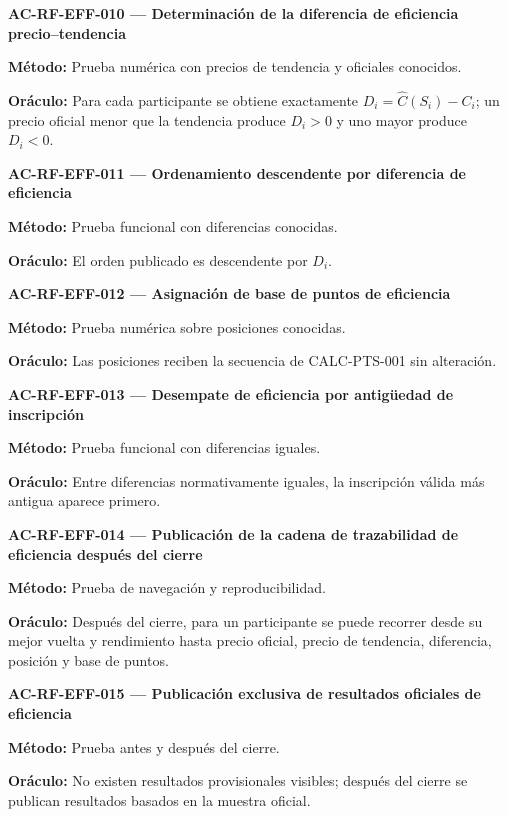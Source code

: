 \documentclass[10pt,letterpaper]{article}
\begin{document}
\noindent\textbf{AC-RF-EFF-010 --- Determinación de la diferencia de eficiencia precio--tendencia}\par
\textbf{Método:} Prueba numérica con precios de tendencia y oficiales conocidos.\par
\textbf{Oráculo:} Para cada participante se obtiene exactamente $D_i=\widehat C(S_i)-C_i$; un precio oficial menor que la tendencia produce $D_i>0$ y uno mayor produce $D_i<0$.\par\vspace{0.45em}
\noindent\textbf{AC-RF-EFF-011 --- Ordenamiento descendente por diferencia de eficiencia}\par
\textbf{Método:} Prueba funcional con diferencias conocidas.\par
\textbf{Oráculo:} El orden publicado es descendente por $D_i$.\par\vspace{0.45em}
\noindent\textbf{AC-RF-EFF-012 --- Asignación de base de puntos de eficiencia}\par
\textbf{Método:} Prueba numérica sobre posiciones conocidas.\par
\textbf{Oráculo:} Las posiciones reciben la secuencia de CALC-PTS-001 sin alteración.\par\vspace{0.45em}
\noindent\textbf{AC-RF-EFF-013 --- Desempate de eficiencia por antigüedad de inscripción}\par
\textbf{Método:} Prueba funcional con diferencias iguales.\par
\textbf{Oráculo:} Entre diferencias normativamente iguales, la inscripción válida más antigua aparece primero.\par\vspace{0.45em}
\noindent\textbf{AC-RF-EFF-014 --- Publicación de la cadena de trazabilidad de eficiencia después del cierre}\par
\textbf{Método:} Prueba de navegación y reproducibilidad.\par
\textbf{Oráculo:} Después del cierre, para un participante se puede recorrer desde su mejor vuelta y rendimiento hasta precio oficial, precio de tendencia, diferencia, posición y base de puntos.\par\vspace{0.45em}
\noindent\textbf{AC-RF-EFF-015 --- Publicación exclusiva de resultados oficiales de eficiencia}\par
\textbf{Método:} Prueba antes y después del cierre.\par
\textbf{Oráculo:} No existen resultados provisionales visibles; después del cierre se publican resultados basados en la muestra oficial.\par\vspace{0.45em}
\end{document}
